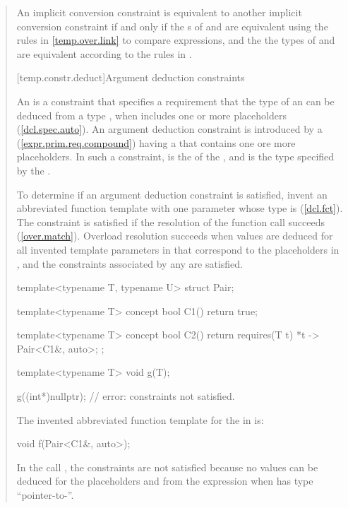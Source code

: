 \begin{quote}
\pnum
An implicit conversion constraint  is equivalent to another implicit 
conversion constraint  if and only if the s 
of  and  are equivalent using the rules in
\ref{temp.over.link} to compare expressions, and the the types
of  and  are equivalent according to the rules in
.


[temp.constr.deduct]{Argument deduction constraints}

\pnum
An  is a constraint that specifies 
a requirement that the type of an  
can be deduced from a type , when  includes one or more 
placeholders (\ref{dcl.spec.auto}).
% 
\enternote
An argument deduction constraint is introduced by a
 (\ref{expr.prim.req.compound}) having a
 that contains one ore more placeholders.
% 
In such a constraint,  is the  of the 
, and  is the type specified
by the .
\exitnote

\pnum
To determine if an argument deduction constraint is satisfied, invent
an abbreviated function template  with one parameter whose
type is  (\ref{dcl.fct}). 
% 
The constraint is satisfied if the resolution of the function call 
 succeeds (\ref{over.match}).
% 
\enternote
Overload resolution succeeds when values are deduced for all invented
template parameters in  that correspond to the placeholders in 
, and the constraints associated by any 
 are satisfied.
\exitnote
% 
\enterexample
\begin{codeblock}
template<typename T, typename U>
  struct Pair;

template<typename T>
  concept bool C1() { return true; }

template<typename T>
  concept bool C2() { return requires(T t) { {*t} -> Pair<C1&, auto>; }; }

template<typename T>
  void g(T);

g((int*)nullptr); // error: constraints not satisfied.
\end{codeblock}
The invented abbreviated function template  for the 
 in  is:
\begin{codeblock}
void f(Pair<C1&, auto>);
\end{codeblock}
In the call , the constraints are not satisfied 
because no values can be deduced for the placeholders  and 
 from the expression  when  has type
``pointer-to-''.
\exitexample


\end{quote}
